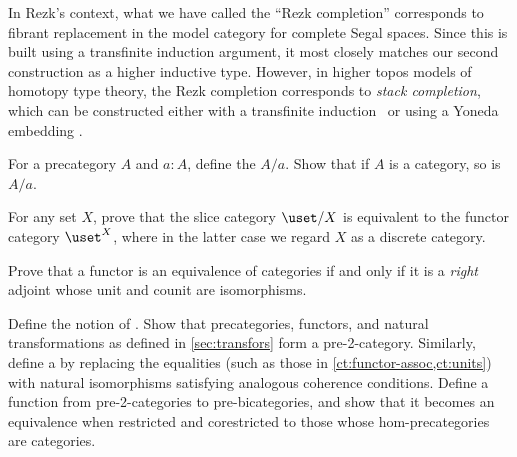 In Rezk's context, what we have called the ``Rezk completion'' corresponds to fibrant replacement
in the model category for complete Segal spaces.
Since this is built using a transfinite induction argument, it most closely matches our second construction as a higher inductive type.
However, in higher topos models of homotopy type theory, the Rezk completion corresponds to \emph{stack completion}, which can be constructed either with a transfinite induction~\cite{jt:strong-stacks} or using a Yoneda embedding \cite{bunge:stacks-morita-internal}.


\sectionExercises

\begin{ex}\label{ex:slice-precategory}
  For a precategory $A$ and $a:A$, define the  $A/a$.
  Show that if $A$ is a category, so is $A/a$.
\end{ex}

\begin{ex}\label{ex:set-slice-over-equiv-functor-category}
  For any set $X$, prove that the slice category $\uset/X$ is equivalent to the functor category $\uset^X$, where in the latter case we regard $X$ as a discrete category.
\end{ex}

\begin{ex}\label{ex:functor-equiv-right-adjoint}
  Prove that a functor is an equivalence of categories if and only if it is a \emph{right} adjoint whose unit and counit are isomorphisms.
\end{ex}

\begin{ex}\label{ct:pre2cat}
  Define the notion of .
  Show that precategories, functors, and natural transformations as defined in \cref{sec:transfors} form a pre-2-category.
  Similarly, define a 
  by replacing the equalities (such as those in \cref{ct:functor-assoc,ct:units}) with natural isomorphisms satisfying analogous coherence conditions.
  Define a function from pre-2-categories to pre-bicategories, and show that it becomes an equivalence when restricted and corestricted to those whose hom-pre\-cat\-egories are categories.
\end{ex}

